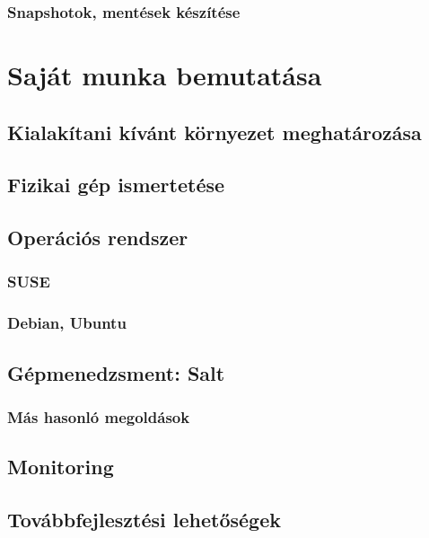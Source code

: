 \subsection{Snapshotok, mentések készítése}


\chapter{Saját munka bemutatása}

\section{Kialakítani kívánt környezet meghatározása}

\section{Fizikai gép ismertetése}

\section{Operációs rendszer}
\subsection{SUSE} %
\subsection{Debian, Ubuntu}

\section{Gépmenedzsment: Salt}
\subsection{Más hasonló megoldások}

\section{Monitoring}

\section{Továbbfejlesztési lehetőségek}